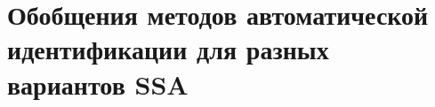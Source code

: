 \documentclass[specialist,
               substylefile = spbu.rtx,
               subf,href,colorlinks=true, 12pt]{disser}
\begin{document}
%
%
%

\chapter{Обобщения методов автоматической идентификации для разных вариантов SSA}
\label{sec:all_methods}
\end{document}
